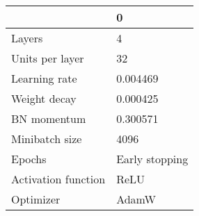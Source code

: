 \begin{tabular}{ll}
\toprule
 & 0 \\
\midrule
Layers & 4 \\
Units per layer & 32 \\
Learning rate & 0.004469 \\
Weight decay & 0.000425 \\
BN momentum & 0.300571 \\
Minibatch size & 4096 \\
Epochs & Early stopping \\
Activation function & ReLU \\
Optimizer & AdamW \\
\bottomrule
\end{tabular}
